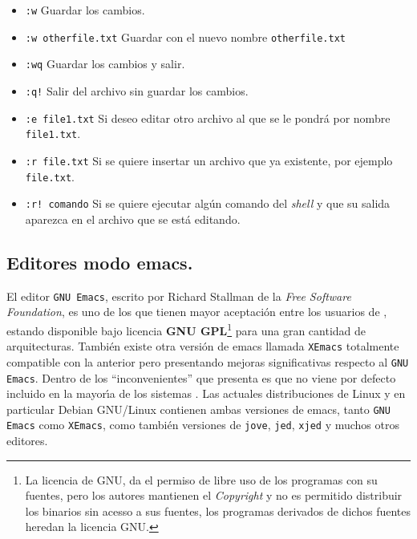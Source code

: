 \begin{itemize}
 
\item \verb+:w+ Guardar los cambios.
 
\item \verb+:w otherfile.txt+ Guardar con el nuevo nombre
  \verb+otherfile.txt+
 
\item \verb+:wq+ Guardar los cambios y salir.
 
\item \verb+:q!+ Salir del archivo sin guardar los cambios. 
  
\item \verb+:e file1.txt+ Si deseo editar otro archivo al que se le
  pondr{\'a} por nombre \verb+file1.txt+.

\item \verb+:r file.txt+ Si se quiere insertar un archivo que ya
  existente, por ejemplo \verb+file.txt+.
 
\item \verb+:r! comando+ Si se quiere ejecutar alg{\'u}n comando del {\it
    shell} y que su salida aparezca en el archivo que se est{\'a}
  editando.

\end{itemize} 

\subsection{Editores modo emacs.}

El editor \verb+GNU Emacs+, escrito por Richard Stallman de la {\it Free
  Software Foundation}, es uno de los que tienen mayor aceptaci{\'o}n
entre los usuarios de {\unix}, estando disponible bajo licencia {\bf
  GNU GPL}\footnote{La licencia de GNU, da el permiso de libre uso de
  los programas con su fuentes, pero los autores mantienen el {\it
    Copyright} y no es permitido distribuir los binarios sin acesso a
  sus fuentes, los programas derivados de dichos fuentes heredan la
  licencia GNU.} para una gran cantidad de arquitecturas. Tambi{\'e}n
existe otra versi{\'o}n de emacs llamada \verb+XEmacs+ totalmente
compatible con la anterior pero presentando mejoras significativas
respecto al \verb+GNU Emacs+.  Dentro de los ``inconvenientes'' que
presenta es que no viene por defecto incluido en la mayor{\'\i}a de los
sistemas {\unix}. Las actuales distribuciones de Linux y en particular
Debian GNU/Linux contienen ambas versiones de emacs, tanto 
\verb+GNU Emacs+ como \verb+XEmacs+, como tambi{\'e}n versiones de \verb+jove+,
\verb+jed+, \verb+xjed+ y muchos otros editores.

